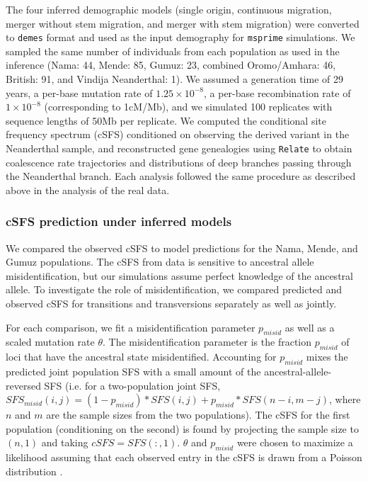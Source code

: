 \documentclass[]{article}
\newcommand{\Relate}{\texttt{Relate}\xspace}
\newcommand{\msprime}{\texttt{msprime}\xspace}
\newcommand{\demes}{\texttt{demes}\xspace}
\begin{document}
The four inferred demographic models (single origin, continuous migration,
merger without stem migration, and merger with stem migration) were converted
to \demes format \citep{Gower2022-yn} and used as
the input demography for \msprime simulations. We sampled the same
number of individuals from each population as used in the inference (Nama: 44,
Mende: 85, Gumuz: 23, combined Oromo/Amhara: 46, British: 91, and Vindija
Neanderthal: 1). We assumed a generation time of 29 years, a per-base mutation
rate of $1.25\times10^{-8}$, a per-base recombination rate of $1\times10^{-8}$
(corresponding to 1cM/Mb), and we simulated 100 replicates with sequence
lengths of 50Mb per replicate. We computed the conditional site frequency
spectrum (cSFS) conditioned on observing the derived variant in the Neanderthal
sample, and reconstructed gene genealogies using \Relate to obtain coalescence
rate trajectories and distributions of deep branches passing through the
Neanderthal branch. Each analysis followed the same procedure as described
above in the analysis of the real data.

\subsubsection{cSFS prediction under inferred models}
\label{sec:misspecification}
We compared the observed cSFS to model predictions for the Nama, Mende, and
Gumuz populations. The cSFS from data is sensitive to ancestral allele
misidentification, but our simulations assume perfect knowledge of the
ancestral allele. To investigate the role of misidentification, we compared
predicted and observed cSFS for transitions and transversions separately as
well as jointly.

For each comparison, we fit a misidentification parameter $p_{misid}$ as well
as a scaled mutation rate $\theta$. The misidentification parameter is the
fraction $p_{misid}$ of loci that have the ancestral state misidentified.
Accounting for $p_{misid}$ mixes the predicted joint population SFS with a
small amount of the ancestral-allele-reversed SFS (i.e. for a two-population
joint SFS, $SFS_{misid}(i, j)=(1-p_{misid})*SFS(i, j) + p_{misid}*SFS(n-i,
m-j)$, where $n$ and $m$ are the sample sizes from the two populations). The
cSFS for the first population (conditioning on the second) is found by
projecting the sample size to $(n, 1)$ and taking $cSFS=SFS(:,1)$. $\theta$ and
$p_{misid}$ were chosen to maximize a likelihood assuming that each observed
entry in the cSFS is drawn from a Poisson distribution \citep{Sawyer1992-rt}.
\end{document}
